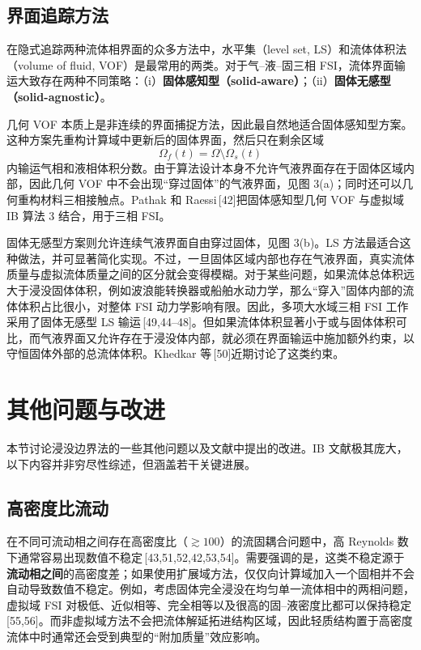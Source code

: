 \documentclass[UTF8,11pt,a4paper]{ctexart}
\begin{document}
\subsection{界面追踪方法}

在隐式追踪两种流体相界面的众多方法中，水平集（level set, LS）和流体体积法（volume of fluid, VOF）是最常用的两类。对于气--液--固三相 FSI，流体界面输运大致存在两种不同策略：（i）\textbf{固体感知型（solid-aware）}；（ii）\textbf{固体无感型（solid-agnostic）}。

几何 VOF 本质上是非连续的界面捕捉方法，因此最自然地适合固体感知型方案。这种方案先重构计算域中更新后的固体界面，然后只在剩余区域
\[
\Omega_f(t)=\Omega\setminus\Omega_s(t)
\]
内输运气相和液相体积分数。由于算法设计本身不允许气液界面存在于固体区域内部，因此几何 VOF 中不会出现“穿过固体”的气液界面，见图 3(a)；同时还可以几何重构材料三相接触点。Pathak 和 Raessi\,[42]把固体感知型几何 VOF 与虚拟域 IB 算法 3 结合，用于三相 FSI。

固体无感型方案则允许连续气液界面自由穿过固体，见图 3(b)。LS 方法最适合这种做法，并可显著简化实现。不过，一旦固体区域内部也存在气液界面，真实流体质量与虚拟流体质量之间的区分就会变得模糊。对于某些问题，如果流体总体积远大于浸没固体体积，例如波浪能转换器或船舶水动力学，那么“穿入”固体内部的流体体积占比很小，对整体 FSI 动力学影响有限。因此，多项大水域三相 FSI 工作采用了固体无感型 LS 输运\,[49,44--48]。但如果流体体积显著小于或与固体体积可比，而气液界面又允许存在于浸没体内部，就必须在界面输运中施加额外约束，以守恒固体外部的总流体体积。Khedkar 等\,[50]近期讨论了这类约束。

\section{其他问题与改进}

本节讨论浸没边界法的一些其他问题以及文献中提出的改进。IB 文献极其庞大，以下内容并非穷尽性综述，但涵盖若干关键进展。

\subsection{高密度比流动}

在不同可流动相之间存在高密度比（$\gtrsim100$）的流固耦合问题中，高 Reynolds 数下通常容易出现数值不稳定\,[43,51,52,42,53,54]。需要强调的是，这类不稳定源于\textbf{流动相之间}的高密度差；如果使用扩展域方法，仅仅向计算域加入一个固相并不会自动导致数值不稳定。例如，考虑固体完全浸没在均匀单一流体相中的两相问题，虚拟域 FSI 对极低、近似相等、完全相等以及很高的固--液密度比都可以保持稳定\,[55,56]。而非虚拟域方法不会把流体解延拓进结构区域，因此轻质结构置于高密度流体中时通常还会受到典型的“附加质量”效应影响。
\end{document}
